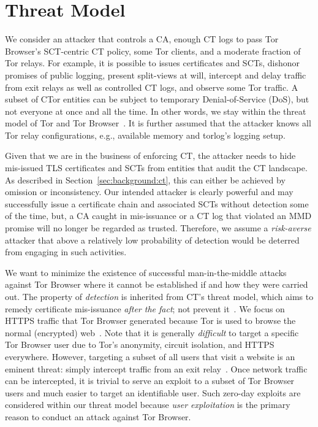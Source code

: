\section{Threat Model} \label{sec:adversary}
%
%
We consider an attacker that controls
	a CA,
	enough CT logs to pass Tor Browser's SCT-centric CT policy, 
	some Tor clients, and
	a moderate fraction of Tor relays.
For example, it is possible to
	issues certificates and SCTs,
	dishonor promises of public logging,
	present split-views at will,
	intercept and delay traffic from exit relays as well as controlled CT logs,
		and
	observe some Tor traffic.
A subset of CTor entities can be subject to temporary Denial-of-Service (DoS),
but not everyone at once and all the time.  In other words, we stay within the
threat model of Tor and Tor Browser~\cite{tor,tor-browser}.  It is further
assumed that the attacker knows all Tor relay configurations, e.g., available
memory and torlog's logging setup.

%
%
Given that we are in the business of enforcing CT, the attacker needs to hide
mis-issued TLS certificates and SCTs from entities that audit the CT landscape.
As described in Section~\ref{sec:background:ct}, this can either be achieved by
omission or inconsistency.  Our intended attacker is clearly powerful and may
successfully issue a certificate chain and associated SCTs without detection
some of the time, but, a CA caught in mis-issuance or a CT log that violated an
MMD promise will no longer be regarded as trusted.  Therefore, we assume a
\emph{risk-averse} attacker that above a relatively low probability of detection
would be deterred from engaging in such activities.

%
%
We want to minimize the existence of successful man-in-the-middle attacks
against Tor Browser where it cannot be established if
and how they were carried out.  The property of \emph{detection} is inherited
from CT's threat model, which aims to remedy certificate mis-issuance
\emph{after the fact}; not prevent it~\cite{ct/a}.  We
focus on HTTPS traffic that Tor Browser generated because Tor is used to browse
the normal (encrypted) web~\cite{mani}.  Note that it is generally
\emph{difficult} to target a specific Tor Browser user due to Tor's anonymity,
circuit isolation, and HTTPS everywhere.  However, targeting a subset of all
users that visit a website is an eminent threat:
	simply intercept traffic from an exit relay~\cite{spoiled-onions}.
Once network traffic can be intercepted, it is trivial to serve an exploit to a
subset of Tor Browser users and much easier to target an identifiable user.
Such zero-day exploits are considered within our threat model because \emph{user
exploitation} is the primary reason to conduct an attack against Tor Browser.

